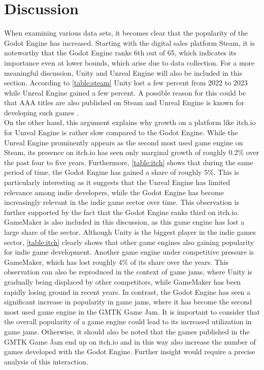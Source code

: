 \section{Discussion}
When examining various data sets, it becomes clear that the popularity of the Godot Engine has increased.
Starting with the digital sales platform Steam, it is noteworthy that the Godot Engine ranks 6th out of 65, which indicates its importance even at lower bounds, which arise due to data collection.
For a more meaningful discussion, Unity and Unreal Engine will also be included in this section.
According to \autoref{table:steam} Unity lost a few percent from 2022 to 2023 while Unreal Engine gained a few percent.
A possible reason for this could be that AAA titles are also published on Steam and Unreal Engine is known for developing such games \cite{unreal-tripple-a-yager, unreal-tripple-a-india}.\\

On the other hand, this argument explains why growth on a platform like itch.io for Unreal Engine is rather slow compared to the Godot Engine.
While the Unreal Engine prominently appears as the second most used game engine on Steam, its presence on itch.io has seen only marginal growth of roughly 0.2\% over the past four to five years.
Furthermore, \autoref{table:itch} shows that during the same period of time, the Godot Engine has gained a share of roughly 5\%.
This is particularly interesting as it suggests that the Unreal Engine has limited relevance among indie developers, while the Godot Engine has become increasingly relevant in the indie game sector over time.
This observation is further supported by the fact that the Godot Engine ranks third on itch.io.\\

GameMaker is also included in this discussion, as this game engine has lost a large share of the sector.
Although Unity is the biggest player in the indie games sector, \autoref{table:itch} clearly shows that other game engines also gaining popularity for indie game development.
Another game engine under competitive pressure is GameMaker, which has lost roughly 4\% of its share over the years.
This observation can also be reproduced in the context of game jams, where Unity is gradually being displaced by other competitors, while GameMaker has been rapidly losing ground in recent years.
In contrast, the Godot Engine has seen a significant increase in popularity in game jams, where it has become the second most used game engine in the GMTK Game Jam.
It is important to consider that the overall popularity of a game engine could lead to its increased utilization in game jams.
Otherwise, it should also be noted that the games published in the GMTK Game Jam end up on itch.io and in this way also increase the number of games developed with the Godot Engine.
Further insight would require a precise analysis of this interaction. \\

